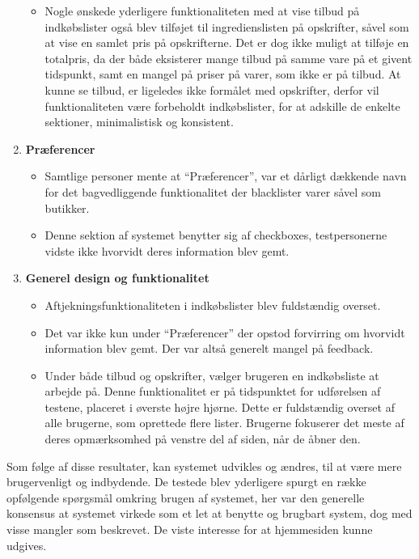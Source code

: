 \begin{enumerate}
\begin{itemize}
   								  \item Nogle ønskede yderligere funktionaliteten med at vise tilbud på indkøbslister også blev tilføjet til ingredienslisten på opskrifter, såvel som at vise en samlet pris på opskrifterne.
   								  Det er dog ikke muligt at tilføje en totalpris, da der både eksisterer mange tilbud på samme vare på et givent tidspunkt, samt en mangel på priser på varer, som ikke er på tilbud.
   								  At kunne se tilbud, er ligeledes ikke formålet med opskrifter, derfor vil funktionaliteten være forbeholdt indkøbslister, for at adskille de enkelte sektioner, minimalistisk og konsistent.
   							   \end{itemize}
   \item \textbf{Præferencer}\begin{itemize}
   								  \item Samtlige personer mente at ``Præferencer'', var et dårligt dækkende navn for det bagvedliggende funktionalitet der blacklister varer såvel som butikker.
   								  
   								  \item Denne sektion af systemet benytter sig af checkboxes, testpersonerne vidste ikke hvorvidt deres information blev gemt.
   							   \end{itemize}
   \item \textbf{Generel design og funktionalitet}\begin{itemize}
   								  \item Aftjekningsfunktionaliteten i indkøbslister blev fuldstændig overset.
   								  \item Det var ikke kun under ``Præferencer'' der opstod forvirring om hvorvidt information blev gemt. 
   								  Der var altså generelt mangel på feedback.
   								  \item Under både tilbud og opskrifter, vælger brugeren en indkøbsliste at arbejde på.
   								  Denne funktionalitet er på tidspunktet for udførelsen af testene, placeret i øverste højre hjørne.
   								  Dette er fuldstændig overset af alle brugerne, som oprettede flere lister.
   								  Brugerne fokuserer det meste af deres opmærksomhed på venstre del af siden, når de åbner den.
   							   \end{itemize}
\end{enumerate}

Som følge af disse resultater, kan systemet udvikles og ændres, til at være mere brugervenligt og indbydende.
De testede blev yderligere spurgt en række opfølgende spørgsmål omkring brugen af systemet, her var den generelle konsensus at systemet virkede som et let at benytte og brugbart system, dog med visse mangler som beskrevet.
De viste interesse for at hjemmesiden kunne udgives.

